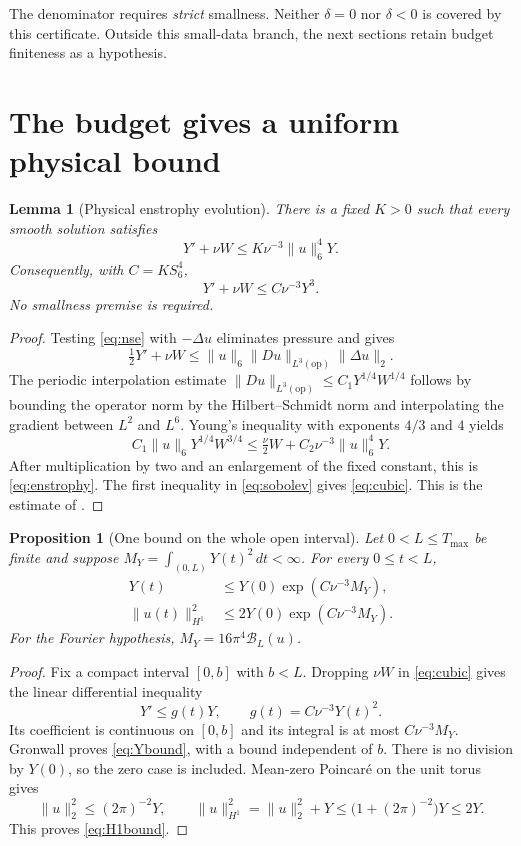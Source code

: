 \documentclass[11pt,a4paper]{article}
\numberwithin{equation}{section}
\theoremstyle{plain}
\newtheorem{proposition}[theorem]{Proposition}
\newtheorem{lemma}[theorem]{Lemma}
\theoremstyle{definition}
\theoremstyle{remark}
\newcommand{\norm}[2]{\lVert #1\rVert_{#2}}
\newcommand{\Tmax}{T_{\max}}
\newcommand{\Budget}{\mathcal B}
\begin{document}
The denominator requires \emph{strict} smallness. Neither $\delta=0$
nor $\delta<0$ is covered by this certificate. Outside this small-data
branch, the next sections retain budget finiteness as a hypothesis.

\section{The budget gives a uniform physical bound}\label{sec:gronwall}
\begin{lemma}[Physical enstrophy evolution]\label{lem:enstrophy}
There is a fixed $K>0$ such that every smooth solution satisfies
\begin{equation}\label{eq:enstrophy}
 Y'+\nu W\le K\nu^{-3}\norm{u}{6}^4Y.
\end{equation}
Consequently, with $C=KS_6^4$,
\begin{equation}\label{eq:cubic}
 Y'+\nu W\le C\nu^{-3}Y^3.
\end{equation}
No smallness premise is required.
\end{lemma}
\begin{proof}
Testing \eqref{eq:nse} with $-\Delta u$ eliminates pressure and gives
\[
 \tfrac12Y'+\nu W
 \le \norm{u}{6}\norm{Du}{L^3(\mathrm{op})}\norm{\Delta u}{2}.
\]
The periodic interpolation estimate
$\norm{Du}{L^3(\mathrm{op})}\le C_1Y^{1/4}W^{1/4}$ follows by bounding
the operator norm by the Hilbert--Schmidt norm and interpolating the
gradient between $L^2$ and $L^6$. Young's inequality with exponents
$4/3$ and $4$ yields
\[
 C_1\norm{u}{6}Y^{1/4}W^{3/4}
 \le\tfrac\nu2 W+C_2\nu^{-3}\norm{u}{6}^4Y.
\]
After multiplication by two and an enlargement of the fixed constant,
this is \eqref{eq:enstrophy}. The first inequality in
\eqref{eq:sobolev} gives \eqref{eq:cubic}. This is the estimate of
\cite[Lemma~5.1]{small}.
\end{proof}

\begin{proposition}[One bound on the whole open interval]\label{prop:H1}
Let $0<L\le\Tmax$ be finite and suppose
$M_Y=\int_{(0,L)}Y(t)^2\,dt<\infty$. For every $0\le t<L$,
\begin{align}
 Y(t)&\le Y(0)\exp(C\nu^{-3}M_Y),\label{eq:Ybound}\\
 \norm{u(t)}{H^1}^2
 &\le2Y(0)\exp(C\nu^{-3}M_Y).\label{eq:H1bound}
\end{align}
For the Fourier hypothesis, $M_Y=16\pi^4\Budget_L(u)$.
\end{proposition}
\begin{proof}
Fix a compact interval $[0,b]$ with $b<L$. Dropping $\nu W$ in
\eqref{eq:cubic} gives the linear differential inequality
\[
 Y'\le g(t)Y,\qquad g(t)=C\nu^{-3}Y(t)^2.
\]
Its coefficient is continuous on $[0,b]$ and its integral is at most
$C\nu^{-3}M_Y$. Gronwall proves \eqref{eq:Ybound}, with a bound
independent of $b$. There is no division by $Y(0)$, so the zero case is
included. Mean-zero Poincar\'e on the unit torus gives
\[
 \norm{u}{2}^2\le(2\pi)^{-2}Y,
 \qquad \norm{u}{H^1}^2=\norm{u}{2}^2+Y
 \le\bigl(1+(2\pi)^{-2}\bigr)Y\le2Y.
\]
This proves \eqref{eq:H1bound}.
\end{proof}
\end{document}
